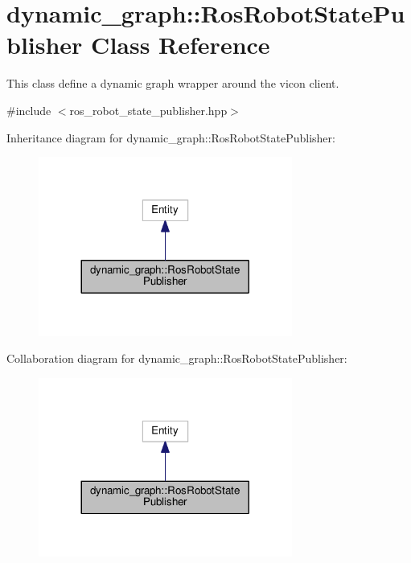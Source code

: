 \hypertarget{classdynamic__graph_1_1RosRobotStatePublisher}{}\section{dynamic\+\_\+graph\+:\+:Ros\+Robot\+State\+Publisher Class Reference}
\label{classdynamic__graph_1_1RosRobotStatePublisher}


This class define a dynamic graph wrapper around the vicon client.  




{\ttfamily \#include $<$ros\+\_\+robot\+\_\+state\+\_\+publisher.\+hpp$>$}



Inheritance diagram for dynamic\+\_\+graph\+:\+:Ros\+Robot\+State\+Publisher\+:\nopagebreak
\begin{figure}[H]
\begin{center}
\leavevmode
\includegraphics[width=236pt]{classdynamic__graph_1_1RosRobotStatePublisher__inherit__graph}
\end{center}
\end{figure}


Collaboration diagram for dynamic\+\_\+graph\+:\+:Ros\+Robot\+State\+Publisher\+:\nopagebreak
\begin{figure}[H]
\begin{center}
\leavevmode
\includegraphics[width=236pt]{classdynamic__graph_1_1RosRobotStatePublisher__coll__graph}
\end{center}
\end{figure}
